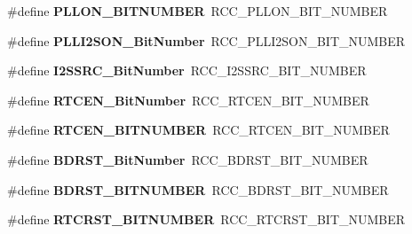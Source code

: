 \begin{DoxyCompactItemize}
\item 
\mbox{\label{group___h_a_l___r_c_c___aliased_ga1360ce96541cc7c323d3ea4b5b885a64}} 
\#define {\bfseries P\+L\+L\+O\+N\+\_\+\+B\+I\+T\+N\+U\+M\+B\+ER}~R\+C\+C\+\_\+\+P\+L\+L\+O\+N\+\_\+\+B\+I\+T\+\_\+\+N\+U\+M\+B\+ER
\item 
\mbox{\label{group___h_a_l___r_c_c___aliased_gabae59c3e4200523e3aa5b6e10aee8c46}} 
\#define {\bfseries P\+L\+L\+I2\+S\+O\+N\+\_\+\+Bit\+Number}~R\+C\+C\+\_\+\+P\+L\+L\+I2\+S\+O\+N\+\_\+\+B\+I\+T\+\_\+\+N\+U\+M\+B\+ER
\item 
\mbox{\label{group___h_a_l___r_c_c___aliased_ga9561d436b438d8f513b754f1934c3e30}} 
\#define {\bfseries I2\+S\+S\+R\+C\+\_\+\+Bit\+Number}~R\+C\+C\+\_\+\+I2\+S\+S\+R\+C\+\_\+\+B\+I\+T\+\_\+\+N\+U\+M\+B\+ER
\item 
\mbox{\label{group___h_a_l___r_c_c___aliased_ga9302c551752124766afc4cee65436405}} 
\#define {\bfseries R\+T\+C\+E\+N\+\_\+\+Bit\+Number}~R\+C\+C\+\_\+\+R\+T\+C\+E\+N\+\_\+\+B\+I\+T\+\_\+\+N\+U\+M\+B\+ER
\item 
\mbox{\label{group___h_a_l___r_c_c___aliased_ga58db3c6eeaa150182f32e741e2ad8066}} 
\#define {\bfseries R\+T\+C\+E\+N\+\_\+\+B\+I\+T\+N\+U\+M\+B\+ER}~R\+C\+C\+\_\+\+R\+T\+C\+E\+N\+\_\+\+B\+I\+T\+\_\+\+N\+U\+M\+B\+ER
\item 
\mbox{\label{group___h_a_l___r_c_c___aliased_gae6718158034388d8fde8caaa28ffe8b9}} 
\#define {\bfseries B\+D\+R\+S\+T\+\_\+\+Bit\+Number}~R\+C\+C\+\_\+\+B\+D\+R\+S\+T\+\_\+\+B\+I\+T\+\_\+\+N\+U\+M\+B\+ER
\item 
\mbox{\label{group___h_a_l___r_c_c___aliased_ga8a86677bfcc1259edf9b9a5f85e7e04a}} 
\#define {\bfseries B\+D\+R\+S\+T\+\_\+\+B\+I\+T\+N\+U\+M\+B\+ER}~R\+C\+C\+\_\+\+B\+D\+R\+S\+T\+\_\+\+B\+I\+T\+\_\+\+N\+U\+M\+B\+ER
\item 
\mbox{\label{group___h_a_l___r_c_c___aliased_ga0cfaa60ebd031d12bff625ca896f1fd5}} 
\#define {\bfseries R\+T\+C\+R\+S\+T\+\_\+\+B\+I\+T\+N\+U\+M\+B\+ER}~R\+C\+C\+\_\+\+R\+T\+C\+R\+S\+T\+\_\+\+B\+I\+T\+\_\+\+N\+U\+M\+B\+ER

\end{DoxyCompactItemize}
